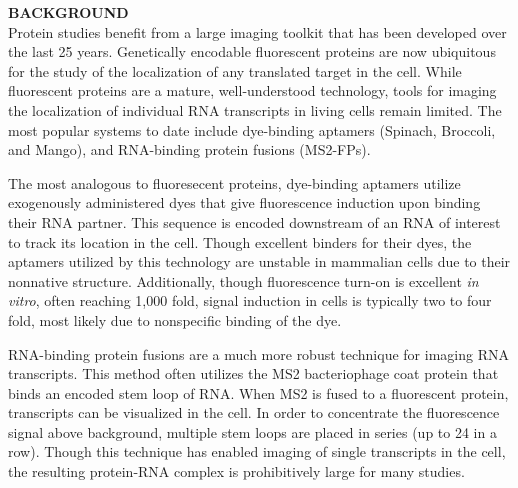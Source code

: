 \textbf{BACKGROUND}\\
Protein studies benefit from a large imaging toolkit that has been developed over the last 25 years. Genetically encodable fluorescent proteins are now ubiquitous for the study of the localization of any translated target in the cell. While fluorescent proteins are a mature, well-understood technology, tools for imaging the localization of individual RNA transcripts in living cells remain limited. The most popular systems to date include dye-binding aptamers (Spinach\cite{PaigeRNAMimicsGreen2011}, Broccoli\cite{FilonovBroccoliRapidSelection2014}, and Mango\cite{AutourFluorogenicRNAMango2018,DolgosheinaRNAMangoAptamerFluorophore2014}), and RNA-binding protein fusions (MS2-FPs)\cite{FuscoSinglemRNAMolecules2003}.

The most analogous to fluoresecent proteins, dye-binding aptamers utilize exogenously administered dyes that give fluorescence induction upon binding their RNA partner\cite{PaigeRNAMimicsGreen2011,FilonovBroccoliRapidSelection2014,AutourFluorogenicRNAMango2018,DolgosheinaRNAMangoAptamerFluorophore2014}.
This sequence is encoded downstream of an RNA of interest to track its location in the cell. Though excellent binders for their dyes, the aptamers utilized by this technology are unstable in mammalian cells due to their nonnative structure\cite{EtzelSyntheticRiboswitchesPlug2017}. %
Additionally, though fluorescence turn-on is excellent \textit{in vitro}, often reaching 1,000 fold, signal induction in cells is typically two to four fold, most likely due to nonspecific binding of the dye.

RNA-binding protein fusions are a much more robust technique for imaging RNA transcripts\cite{FuscoSinglemRNAMolecules2003}. This method often utilizes the MS2 bacteriophage coat protein that binds an encoded stem loop of RNA. When MS2 is fused to a fluorescent protein, transcripts can be visualized in the cell. In order to concentrate the fluorescence signal above background, multiple stem loops are placed in series (up to 24 in a row). Though this technique has enabled imaging of single transcripts in the cell\cite{MorisakiRealtimequantificationsingle2016,FuscoSinglemRNAMolecules2003}, the resulting protein-RNA complex is prohibitively large for many studies.

